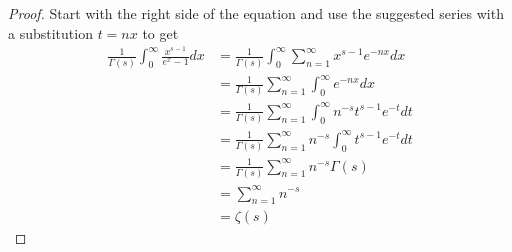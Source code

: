 \documentclass[10pt]{article}
\theoremstyle{plain}
\theoremstyle{remark}
\begin{document}
\begin{proof}
  Start with the right side of the equation and use the suggested series
  with a substitution $t=nx$ to get
  \begin{align*}
    \frac{1}{\Gamma\left(s\right)}\int_0^\infty \frac{x^{s-1}}{e^x-1}dx &= \frac{1}{\Gamma\left(s\right)}\int_0^\infty\sum_{n=1}^\infty x^{s-1}e^{-nx}dx\\
                                                &=\frac{1}{\Gamma\left(s\right)}\sum_{n=1}^\infty \int_0^\infty e^{-nx}dx\\
                                                &=\frac{1}{\Gamma\left(s\right)}\sum_{n=1}^\infty \int_0^\infty n^{-s}t^{s-1}e^{-t}dt\\
                                                &=\frac{1}{\Gamma\left(s\right)}\sum_{n=1}^\infty n^{-s}\int_0^\infty t^{s-1}e^{-t}dt\\
                                                &=\frac{1}{\Gamma\left(s\right)}\sum_{n=1}^\infty n^{-s}\Gamma\left(s\right)\\
                                                &=\sum_{n=1}^\infty n^{-s}\\
                                                &= \zeta\left(s\right)
  \end{align*}
\end{proof}

\end{document}

